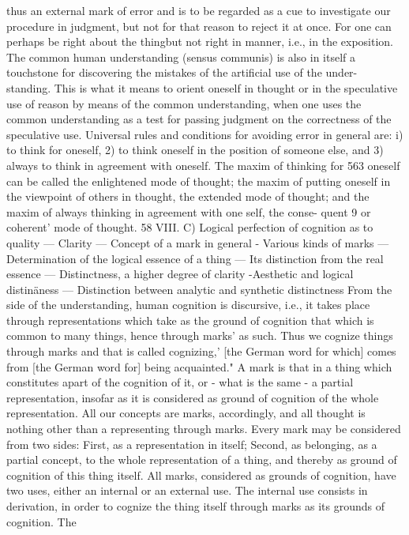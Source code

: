 thus an external mark of error and is to be regarded as a cue to investigate
our procedure in judgment, but not for that reason to reject it at once. For
one can perhaps be right about the thingbut not right in manner, i.e., in the
exposition.
The common human understanding (sensus communis) is also in itself a
touchstone for discovering the mistakes of the artificial use of the under-
standing. This is what it means to orient oneself in thought or in the
speculative use of reason by means of the common understanding, when
one uses the common understanding as a test for passing judgment on the
correctness of the speculative use.
Universal rules and conditions for avoiding error in general are: i) to
think for oneself, 2) to think oneself in the position of someone else, and
3) always to think in agreement with oneself. The maxim of thinking for
563
oneself can be called the enlightened mode of thought; the maxim of putting
oneself in the viewpoint of others in thought, the extended mode of thought;
and the maxim of always thinking in agreement with one self, the conse-
quent 9 or coherent' mode of thought.
58
VIII.
C) Logical perfection of cognition as to quality — Clarity — Concept of
a mark in general - Various kinds of marks — Determination of the
logical essence of a thing — Its distinction from the real essence —
Distinctness, a higher degree of clarity -Aesthetic and logical
distinäness — Distinction between analytic and synthetic distinctness
From the side of the understanding, human cognition is discursive, i.e., it
takes place through representations which take as the ground of cognition
that which is common to many things, hence through marks' as such. Thus
we cognize things through marks and that is called cognizing,' [the German
word for which] comes from [the German word for] being acquainted."
A mark is that in a thing which constitutes apart of the cognition of it, or -
what is the same - a partial representation, insofar as it is considered as
ground of cognition of the whole representation. All our concepts are marks,
accordingly, and all thought is nothing other than a representing through
marks.
Every mark may be considered from two sides:
First, as a representation in itself;
Second, as belonging, as a partial concept, to the whole representation of
a thing, and thereby as ground of cognition of this thing itself.
All marks, considered as grounds of cognition, have two uses, either an
internal or an external use. The internal use consists in derivation, in order
to cognize the thing itself through marks as its grounds of cognition. The
